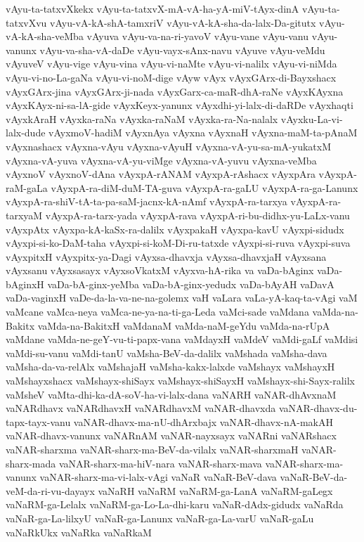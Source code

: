 {vAyu-ta-tatxvXkekx
vAyu-ta-tatxvX-mA-vA-ha-yA-miV-tAyx-dinA
vAyu-ta-tatxvXvu
vAyu-vA-kA-shA-tamxriV
vAyu-vA-kA-sha-da-lalx-Da-gitutx
vAyu-vA-kA-sha-veMba
vAyuva
vAyu-va-na-ri-yavoV
vAyu-vane
vAyu-vanu
vAyu-vanunx
vAyu-va-sha-vA-daDe
vAyu-vayx-sAnx-navu
vAyuve
vAyu-veMdu
vAyuveV
vAyu-vige
vAyu-vina
vAyu-vi-naMte
vAyu-vi-nalilx
vAyu-vi-niMda
vAyu-vi-no-La-gaNa
vAyu-vi-noM-dige
vAyw
vAyx
vAyxGArx-di-Bayxshacx
vAyxGArx-jina
vAyxGArx-ji-nada
vAyxGarx-ca-maR-dhA-raNe
vAyxKAyxna
vAyxKAyx-ni-sa-lA-gide
vAyxKeyx-yanunx
vAyxdhi-yi-lalx-di-daRDe
vAyxhaqti
vAyxkAraH
vAyxka-raNa
vAyxka-raNaM
vAyxka-ra-Na-nalalx
vAyxku-La-vi-lalx-dude
vAyxmoV-hadiM
vAyxnAya
vAyxna
vAyxnaH
vAyxna-maM-ta-pAnaM
vAyxnashacx
vAyxna-vAyu
vAyxna-vAyuH
vAyxna-vA-yu-sa-mA-yukatxM
vAyxna-vA-yuva
vAyxna-vA-yu-viMge
vAyxna-vA-yuvu
vAyxna-veMba
vAyxnoV
vAyxnoV-dAna
vAyxpA-rANAM
vAyxpA-rAshacx
vAyxpAra
vAyxpA-raM-gaLa
vAyxpA-ra-diM-duM-TA-guva
vAyxpA-ra-gaLU
vAyxpA-ra-ga-Lanunx
vAyxpA-ra-shiV-tA-ta-pa-saM-jacnx-kA-nAmf
vAyxpA-ra-tarxya
vAyxpA-ra-tarxyaM
vAyxpA-ra-tarx-yada
vAyxpA-rava
vAyxpA-ri-bu-didhx-yu-LaLx-vanu
vAyxpAtx
vAyxpa-kA-kaSx-ra-dalilx
vAyxpakaH
vAyxpa-kavU
vAyxpi-sidudx
vAyxpi-si-ko-DaM-taha
vAyxpi-si-koM-Di-ru-tatxde
vAyxpi-si-ruva
vAyxpi-suva
vAyxpitxH
vAyxpitx-ya-Dagi
vAyxsa-dhavxja
vAyxsa-dhavxjaH
vAyxsana
vAyxsanu
vAyxsasayx
vAyxsoVkatxM
vAyxva-hA-rika
va
vaDa-bAginx
vaDa-bAginxH
vaDa-bA-ginx-yeMba
vaDa-bA-ginx-yedudx
vaDa-bAyAH
vaDavA
vaDa-vaginxH
vaDe-da-la-va-ne-na-golemx
vaH
vaLara
vaLa-yA-kaq-ta-vAgi
vaM
vaMcane
vaMca-neya
vaMca-ne-ya-na-ti-ga-Leda
vaMci-sade
vaMdana
vaMda-na-Bakitx
vaMda-na-BakitxH
vaMdanaM
vaMda-naM-geYdu
vaMda-na-rUpA
vaMdane
vaMda-ne-geY-vu-ti-papx-vana
vaMdayxH
vaMdeV
vaMdi-gaLf
vaMdisi
vaMdi-su-vanu
vaMdi-tanU
vaMsha-BeV-da-dalilx
vaMshada
vaMsha-dava
vaMsha-da-va-relAlx
vaMshajaH
vaMsha-kakx-lalxde
vaMshayx
vaMshayxH
vaMshayxshacx
vaMshayx-shiSayx
vaMshayx-shiSayxH
vaMshayx-shi-Sayx-ralilx
vaMsheV
vaMta-dhi-ka-dA-soV-ha-vi-lalx-dana
vaNARH
vaNAR-dhAvxnaM
vaNARdhavx
vaNARdhavxH
vaNARdhavxM
vaNAR-dhavxda
vaNAR-dhavx-du-tapx-tayx-vanu
vaNAR-dhavx-ma-nU-dhArxbajx
vaNAR-dhavx-nA-makAH
vaNAR-dhavx-vanunx
vaNARnAM
vaNAR-nayxsayx
vaNARni
vaNARshacx
vaNAR-sharxma
vaNAR-sharx-ma-BeV-da-vilalx
vaNAR-sharxmaH
vaNAR-sharx-mada
vaNAR-sharx-ma-hiV-nara
vaNAR-sharx-mava
vaNAR-sharx-ma-vanunx
vaNAR-sharx-ma-vi-lalx-vAgi
vaNaR
vaNaR-BeV-dava
vaNaR-BeV-da-veM-da-ri-vu-dayayx
vaNaRH
vaNaRM
vaNaRM-ga-LanA
vaNaRM-gaLegx
vaNaRM-ga-Lelalx
vaNaRM-ga-Lo-La-dhi-karu
vaNaR-dAdx-gidudx
vaNaRda
vaNaR-ga-La-lilxyU
vaNaR-ga-Lanunx
vaNaR-ga-La-varU
vaNaR-gaLu
vaNaRkUkx
vaNaRka
vaNaRkaM
}

